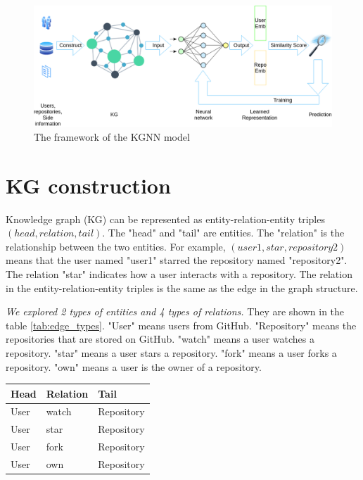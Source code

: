 \documentclass[11pt,twoside]{report}
\begin{document}
\begin{figure}[H]
    \centering
    \includegraphics[scale=0.4]{KGCN Overview.png}
    \caption{The framework of the KGNN model}
    \label{fig:kgnn_framework}
\end{figure}

\section{KG construction}
Knowledge graph (KG) can be represented as entity-relation-entity triples $(head, relation, tail)$. The "head" and "tail" are entities. The "relation" is the relationship between the two entities. For example, $(user1, star, repository2)$ means that the user named "user1" starred the repository named "repository2". The relation "star" indicates how a user interacts with a repository. The relation in the entity-relation-entity triples is the same as the edge in the graph structure.

\textit{We explored 2 types of entities and 4 types of relations.} They are shown in the table \ref{tab:edge_types}. "User" means users from GitHub. "Repository" means the repositories that are stored on GitHub. "watch" means a user watches a repository. "star" means a user stars a repository. "fork" means a user forks a repository. "own" means a user is the owner of a repository. 

\begin{center}
    \begin{tabular}{l | l | l}
    \hline
    Head & Relation & Tail \\
    \hline
    User & watch & Repository \\
    User & star & Repository \\
    User & fork & Repository \\
    User & own & Repository \\
    \end{tabular}
    \label{tab:edge_types}
\end{center}
\end{document}
